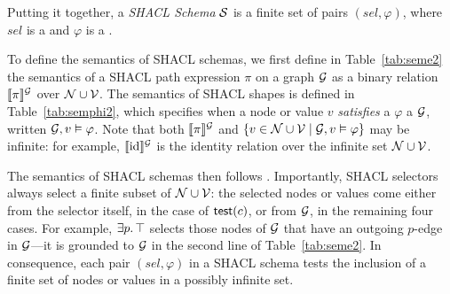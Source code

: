 Putting it together, a \emph{SHACL Schema} $\mathcal{S}$ is a finite set of
pairs $(\mathit{sel}, \varphi)$, where $\mathit{sel}$ is a \selTerm and
$\varphi$ is a \shapeTerm.

To define the semantics of SHACL schemas, we first define in
Table~\ref{tab:seme2} the semantics of a SHACL path expression $\pi$ on a graph
$\mathcal{G}$ as a binary relation $\llbracket \pi \rrbracket^{\mathcal{G}}$ over $\mathcal{N} \cup
\mathcal{V}$.
The semantics of SHACL shapes is defined in Table~\ref{tab:semphi2}, which
specifies when a node or value $v$ \emph{satisfies} a \shapeTerm  $\varphi$ \wrt
a $\mathcal{G}$, written $\mathcal{G}, v \vDash \varphi$.
Note that both $\llbracket \pi \rrbracket^{\mathcal{G}}$ and $\{ v \in \mathcal{N} \cup \mathcal{V}
\mid \mathcal{G}, v \vDash \varphi\}$ may be infinite: for example,
$\llbracket{\text{id}}\rrbracket^{\mathcal{G}}$ is the identity relation over the infinite set $\mathcal{N}
\cup \mathcal{V}$.

The semantics of SHACL schemas then follows .
Importantly, SHACL selectors always select a finite subset of $\mathcal{N} \cup
\mathcal{V}$: the selected nodes or values come either from the selector itself, in
the case of $\mathsf{test}(c)$, or from $\mathcal{G}$, in the remaining four cases.
For example, $\exists p \ldotp \top$  selects those nodes of $\mathcal{G}$ that have
an outgoing $p$-edge in $\mathcal{G}$---it is grounded to $\mathcal{G}$ in the second line
of Table~\ref{tab:seme2}.
In consequence, each pair $(\mathit{sel}, \varphi)$ in a SHACL schema tests the
inclusion of a finite set of nodes or values in a possibly infinite set.

